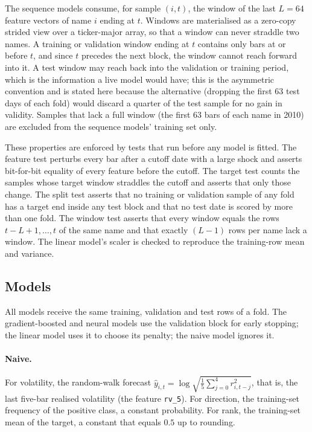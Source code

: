 \documentclass[10pt,a4paper,twoside,twocolumn]{article}
\begin{document}
The sequence models consume, for sample $(i,t)$, the window of the last $L=64$ feature vectors of name $i$ ending at $t$. Windows are materialised as a zero-copy strided view over a ticker-major array, so that a window can never straddle two names. A training or validation window ending at $t$ contains only bars at or before $t$, and since $t$ precedes the next block, the window cannot reach forward into it. A test window may reach back into the validation or training period, which is the information a live model would have; this is the asymmetric convention and is stated here because the alternative (dropping the first 63 test days of each fold) would discard a quarter of the test sample for no gain in validity. Samples that lack a full window (the first 63 bars of each name in 2010) are excluded from the sequence models' training set only.

These properties are enforced by tests that run before any model is fitted. The feature test perturbs every bar after a cutoff date with a large shock and asserts bit-for-bit equality of every feature before the cutoff. The target test counts the samples whose target window straddles the cutoff and asserts that only those change. The split test asserts that no training or validation sample of any fold has a target end inside any test block and that no test date is scored by more than one fold. The window test asserts that every window equals the rows $t-L+1,\dots,t$ of the same name and that exactly $(L-1)$ rows per name lack a window. The linear model's scaler is checked to reproduce the training-row mean and variance.

\subsection{Models}

All models receive the same training, validation and test rows of a fold. The gradient-boosted and neural models use the validation block for early stopping; the linear model uses it to choose its penalty; the naive model ignores it.

\paragraph{Naive.} For volatility, the random-walk forecast $\hat y_{i,t}=\log\sqrt{\tfrac{1}{5}\sum_{j=0}^{4}r_{i,t-j}^2}$, that is, the last five-bar realised volatility (the feature \texttt{rv\_5}). For direction, the training-set frequency of the positive class, a constant probability. For rank, the training-set mean of the target, a constant that equals $0.5$ up to rounding.
\end{document}
